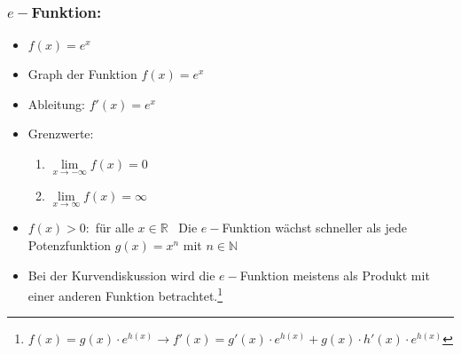 \documentclass[a4paper,twocolumn,10pt]{onepgnote}
\renewcommand\mynote{\notebox{Hinweis:}\ }  %
\begin{document}
 \subsubsection{$e-$Funktion:}
 \begin{itemize}
 \item $f(x) = e^x$
 \item Graph der Funktion $f(x)= e^x$\\
\item Ableitung: $f'(x) = e^x$
\item Grenzwerte:\\
\begin{enumerate}
\item $\lim \limits_{x\longrightarrow -\infty} f(x) = 0$\\
\item $\lim \limits_{x\longrightarrow \infty} f(x) = \infty$
\end{enumerate}
\item $f(x) > 0: $ für alle $x\in \mathds{R}$
\mynote Die $e-$Funktion wächst schneller als jede Potenzfunktion $g(x)= x^n$ mit $n\in\mathds{N}$
\item Bei der Kurvendiskussion wird die $e-$Funktion meistens als Produkt mit einer anderen Funktion betrachtet.\footnote{$f(x) = g(x)\cdot e^{h(x)}  \longrightarrow f'(x) =g'(x)\cdot e^{h(x)} + g(x) \cdot h'(x) \cdot e^{h(x)} $}
 \end{itemize}
\end{document}
